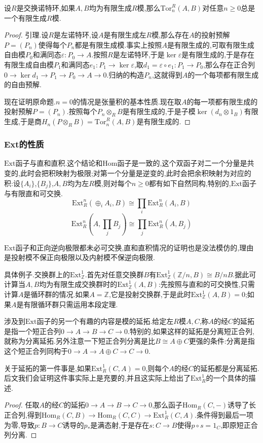 设$R$是交换诺特环,如果$A,B$均为有限生成$R$模,那么$\mathrm{Tor}_n^R(A,B)$对任意$n\ge0$总是一个有限生成$R$模.
\begin{proof}
	
	引理.设$R$是左诺特环,设$A$是有限生成左$R$模,那么存在$A$的投射预解$P=(P_n)$使得每个$P_n$都是有限生成模.事实上按照$A$是有限生成的,可取有限生成自由模$P_0$和满同态$\varepsilon:P_0\to A$.按照$R$是左诺特环,于是$\ker\varepsilon$是有限生成的,于是存在有限生成自由模$P_1$和满同态$e_1:P_1\to\ker\varepsilon$,取$d_1=\varepsilon\circ e_1:P_1\to P_0$,那么存在正合列$0\to\ker d_1\to P_1\to P_0\to A\to0$.归纳的构造$P_n$,这就得到$A$的一个每项都有限生成的自由预解.
	
	现在证明原命题.$n=0$的情况是张量积的基本性质.现在取$A$的每一项都有限生成的投射预解$P=(P_n)$.按照每个$P_n\otimes_RB$是有限生成的,于是子模$\ker(d_n\otimes1_B)$有限生成,于是商$H_n(P\otimes_R B)=\mathrm{Tor}_n^R(A,B)$是有限生成的.
\end{proof}
\subsubsection{Ext的性质}

$\mathrm{Ext}$函子与直和直积.这个结论和$\mathrm{Hom}$函子是一致的,这个双函子对二一个分量是共变的,此时会把积映射为极限;对第一个分量是逆变的,此时会把余积映射为对应的积:设$\{A_i\}$,$\{B_j\}$,$A,B$均为左$R$模,则对每个$n\ge0$都有如下自然同构,特别的,$\mathrm{Ext}$函子与有限直和可交换.
$$\mathrm{Ext}_R^n(\oplus_iA_i,B)\cong\prod_i\mathrm{Ext}_R^n(A_i,B)$$
$$\mathrm{Ext}_R^n(A,\prod_jB_j)\cong\prod_j\mathrm{Ext}_R^n(A,B_j)$$

$\mathrm{Ext}$函子和正向逆向极限都未必可交换,直和直积情况的证明也是没法模仿的,理由是投射模不保正向极限以及内射模不保逆向极限.

具体例子.交换群上的$\mathrm{Ext}_{\mathbb{Z}}^1$.首先对任意交换群$B$有$\mathrm{Ext}_{\mathbb{Z}}^1(\mathbb{Z}/n,B)\cong B/nB$.据此可计算当$A,B$均为有限生成交换群时的$\mathrm{Ext}_{\mathbb{Z}}^1(A,B)$:先按照与直和的可交换性,只需计算$A$是循环群的情况.如果$A=\mathbb{Z}$,它是投射交换群,于是此时$\mathrm{Ext}_{\mathbb{Z}}^1(A,B)=0$;如果$A$是有限循环群只需运用本段定理.

涉及到$\mathrm{Ext}$函子的另一个有趣的内容是模的延拓.给定左$R$模$A,C$,称$A$的经$C$的延拓是指一个短正合列$0\to A\to B\to C\to0$.特别的,如果这样的延拓是分离短正合列,就称为分离延拓.另外注意一下短正合列分离是比$B\cong A\oplus C$更强的条件:分离是指这个短正合列同构于$0\to A\to A\oplus C\to C\to0$.

关于延拓的第一件事是,如果$\mathrm{Ext}_R^1(C,A)=0$,则每个$A$的经$C$的延拓都是分离延拓.后文我们会证明这件事实际上是充要的,并且这实际上给出了$\mathrm{Ext}_R^1$的一个具体的描述.
\begin{proof}
	
	任取$A$的经$C$的延拓$0\to A\to B\to C\to0$,那么函子$\mathrm{Hom}_R(C,-)$诱导了长正合列,得到$\mathrm{Hom}_R(C,B)\to\mathrm{Hom}_R(C,C)\to\mathrm{Ext}_R^1(C,A)$.条件得到最后一项为零,导致$p:B\to C$诱导的$p_*$是满态射,于是存在$s:C\to B$使得$p\circ s=1_C$,即原短正合列分离.
\end{proof}

